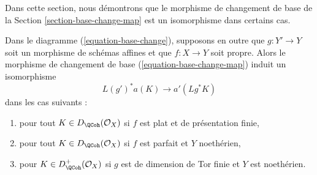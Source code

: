 \noindent
Dans cette section, nous démontrons que le morphisme de changement de base de la
Section \ref{section-base-change-map} est un isomorphisme
dans certains cas.

\begin{lemma}
\label{lemma-more-base-change}
Dans le diagramme (\ref{equation-base-change}), supposons en outre que
$g : Y' \to Y$ soit un morphisme de schémas affines et que $f : X \to Y$ soit propre.
Alors le morphisme de changement de base (\ref{equation-base-change-map}) induit un
isomorphisme
$$
L(g')^*a(K) \longrightarrow a'(Lg^*K)
$$
dans les cas suivants :
\begin{enumerate}
\item pour tout $K \in D_\QCoh(\mathcal{O}_X)$ si $f$
est plat et de présentation finie,
\item pour tout $K \in D_\QCoh(\mathcal{O}_X)$ si $f$
est parfait et $Y$ noethérien,
\item pour $K \in D_\QCoh^+(\mathcal{O}_X)$ si $g$ est de dimension de Tor finie
et $Y$ est noethérien.
\end{enumerate}
\end{lemma}


